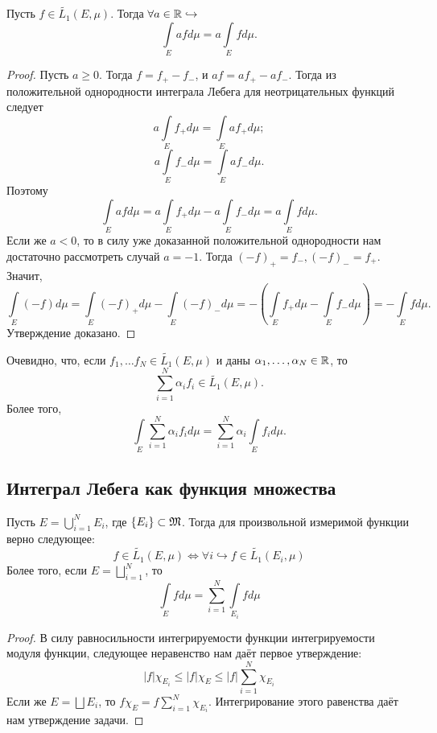 \begin{proposition}
    Пусть $f \in \widetilde{L_1}(E, \mu)$. Тогда $\forall a \in \mathbb{R} \hookrightarrow$ \[\int\limits_E afd\mu = a\int\limits_E fd\mu.\]
\end{proposition}
\begin{proof}
    Пусть $a \geq 0$. Тогда $f = f_+ - f_-$, и $af = af_+ - af_-$. Тогда из положительной однородности интеграла Лебега для неотрицательных функций следует \[a\int\limits_E f_+d\mu = \int\limits_E af_+d\mu;\]
    \[a\int\limits_E f_-d\mu = \int\limits_E af_-d\mu.\]
    Поэтому \[\int\limits_E afd\mu = a\int\limits_E f_+d\mu - a\int\limits_E f_-d\mu = a\int\limits_E fd\mu.\]
    Если же $a < 0$, то в силу уже доказанной положительной однородности нам достаточно рассмотреть случай $a = -1$. Тогда $(-f)_+ = f_-, (-f)_- = f_+$. Значит, \[\int\limits_E (-f)d\mu = \int\limits_E (-f)_+d\mu - \int\limits_E (-f)_-d\mu = -(\int\limits_E f_+d\mu - \int\limits_E f_-d\mu) = -\int\limits_E fd\mu.\]
    Утверждение доказано.
\end{proof}
\begin{corollary}
    Очевидно, что, если $f_1, \ldots f_N \in \widetilde{L_1}(E, \mu)$ и даны $\alpha_1, \ldots, \alpha_N \in \mathbb{R}$, то \[\sum\limits_{i = 1}^N \alpha_if_i \in \widetilde{L_1}(E, \mu).\]
    Более того, \[\int\limits_E \sum\limits_{i = 1}^N \alpha_if_i d\mu = \sum\limits_{i = 1}^N \alpha_i \int\limits_E f_i d\mu.\]
\end{corollary}

\subsection{Интеграл Лебега как функция множества}
\begin{proposition}
    Пусть $E = \bigcup\limits_{i = 1}^N E_i$, где $\{E_i\} \subset \mathfrak{M}$. Тогда для произвольной измеримой функции верно следующее: \[f \in \widetilde{L_1}(E, \mu) \Longleftrightarrow \forall i \hookrightarrow f \in \widetilde{L_1}(E_i, \mu)\]
    Более того, если $E = \bigsqcup\limits_{i = 1}^N$, то \[\int\limits_{E} fd\mu = \sum\limits_{i = 1}^N \int\limits_{E_i} fd\mu\]
\end{proposition}
\begin{proof}
    В силу равносильности интегрируемости функции интегрируемости модуля функции, следующее неравенство нам даёт первое утверждение: \[|f|\chi_{E_i} \leq |f|\chi_E \leq |f|\sum\limits_{i = 1}^N \chi_{E_i}\]
    Если же $E = \bigsqcup E_i$, то $f \chi_E = f \sum\limits_{i = 1}^N \chi_{E_i}$. Интегрирование этого равенства даёт нам утверждение задачи.
\end{proof}


